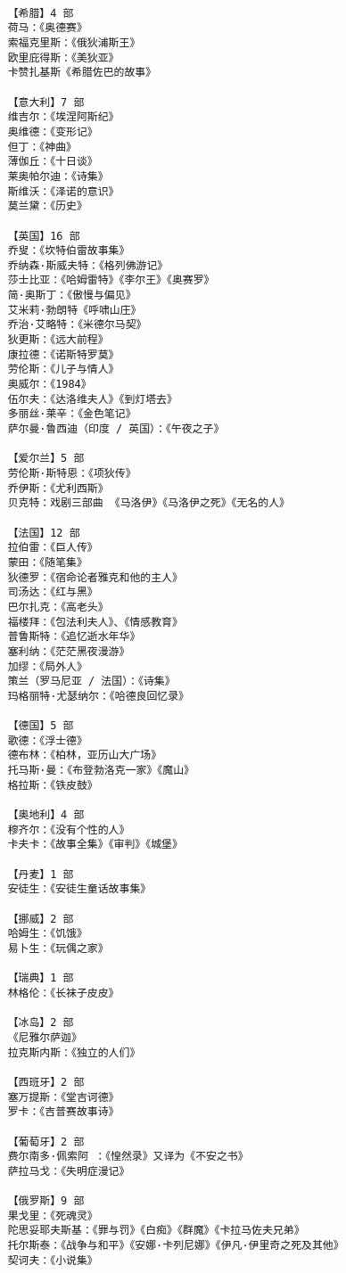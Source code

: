 \documentclass[UTF8]{../RepresentationUniverse}
\begin{document}
\begin{lstlisting}

    【希腊】4 部
    荷马：《奥德赛》
    索福克里斯：《俄狄浦斯王》
    欧里庇得斯：《美狄亚》
    卡赞扎基斯《希腊佐巴的故事》
    
    【意大利】7 部
    维吉尔：《埃涅阿斯纪》
    奥维德：《变形记》
    但丁：《神曲》
    薄伽丘：《十日谈》
    莱奥帕尔迪：《诗集》
    斯维沃：《泽诺的意识》
    莫兰黛：《历史》
    
    【英国】16 部 
    乔叟：《坎特伯雷故事集》
    乔纳森·斯威夫特：《格列佛游记》
    莎士比亚：《哈姆雷特》《李尔王》《奥赛罗》
    简·奥斯丁：《傲慢与偏见》
    艾米莉·勃朗特《呼啸山庄》
    乔治·艾略特：《米德尔马契》
    狄更斯：《远大前程》
    康拉德：《诺斯特罗莫》
    劳伦斯：《儿子与情人》
    奥威尔：《1984》
    伍尔夫：《达洛维夫人》《到灯塔去》
    多丽丝·莱辛：《金色笔记》
    萨尔曼·鲁西迪（印度 / 英国）：《午夜之子》
    
    【爱尔兰】5 部 
    劳伦斯·斯特恩：《项狄传》
    乔伊斯：《尤利西斯》
    贝克特：戏剧三部曲 《马洛伊》《马洛伊之死》《无名的人》
    
    【法国】12 部 
    拉伯雷：《巨人传》
    蒙田：《随笔集》
    狄德罗：《宿命论者雅克和他的主人》
    司汤达：《红与黑》
    巴尔扎克：《高老头》
    福楼拜：《包法利夫人》、《情感教育》
    普鲁斯特：《追忆逝水年华》
    塞利纳：《茫茫黑夜漫游》
    加缪：《局外人》
    策兰（罗马尼亚 / 法国）：《诗集》
    玛格丽特·尤瑟纳尔：《哈德良回忆录》
    
    【德国】5 部
    歌德：《浮士德》
    德布林：《柏林，亚历山大广场》
    托马斯·曼：《布登勃洛克一家》《魔山》
    格拉斯：《铁皮鼓》
    
    【奥地利】4 部 
    穆齐尔：《没有个性的人》
    卡夫卡：《故事全集》《审判》《城堡》
    
    【丹麦】1 部 
    安徒生：《安徒生童话故事集》
    
    【挪威】2 部 
    哈姆生：《饥饿》
    易卜生：《玩偶之家》
    
    【瑞典】1 部
    林格伦：《长袜子皮皮》
    
    【冰岛】2 部
    《尼雅尔萨迦》
    拉克斯内斯：《独立的人们》
    
    【西班牙】2 部 
    塞万提斯：《堂吉诃德》
    罗卡：《吉普赛故事诗》
    
    【葡萄牙】2 部
    费尔南多·佩索阿 ：《惶然录》又译为《不安之书》
    萨拉马戈：《失明症漫记》
    
    【俄罗斯】9 部 
    果戈里：《死魂灵》
    陀思妥耶夫斯基：《罪与罚》《白痴》《群魔》《卡拉马佐夫兄弟》
    托尔斯泰：《战争与和平》《安娜·卡列尼娜》《伊凡·伊里奇之死及其他》
    契诃夫：《小说集》
    

\end{lstlisting}
\end{document}
